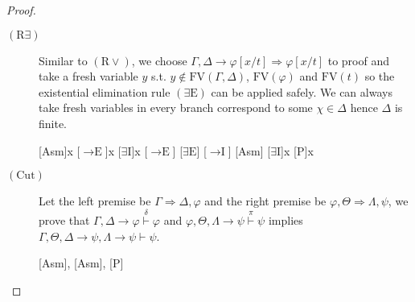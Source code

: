 \documentclass[12pt]{article}
\newcommand\A{\varphi}
\newcommand\B{\psi}
\newcommand\CC{\chi}
\newcommand\GG\Gamma
\newcommand\D\Delta
\newcommand\T\Theta
\newcommand\LL\Lambda
\newcommand\TO\Rightarrow
\newcommand\FV[1]{\mathrm{FV}({#1})}
\newcommand\RO{\textrm{R$\lor$}}
\newcommand\RX{\textrm{R$\exists$}}
\newcommand\Cut{\textrm{Cut}}
\newcommand\II{\textrm{$\to$I}}
\newcommand\IE{\textrm{$\to$E}}
\newcommand\XI{\textrm{$\exists$I}}
\newcommand\XE{\textrm{$\exists$E}}
\newcommand\PLR{\mathrm{P}}
\newcommand{\asm}[1]{\delims{[}{]^{#1}}}
\begin{document}
\begin{enumerate}
\begin{enumerate}
\begin{itemize}
\begin{proof}
\begin{description}
\begin{description}
                    \item[$(\RX)$] Similar to $(\RO)$, we choose $\GG,\D\to\A[x/t]\TO\A[x/t]$ to proof and take a fresh variable $y$ s.t. $y\notin\FV{\GG,\D}$, $\FV{\A}$ and $\FV{t}$ so the existential elimination rule $(\XE)$ can be applied safely. We can always take fresh variables in every branch correspond to some $\CC\in\D$ hence $\D$ is finite.
                    
                    \begin{prooftree*}
                    \hypo{\D}
                    \asm{u}
                    [Asm]{\D\to\exists x\A}
                    [$\IE$]{\exists x\A}
                    \hypo{\A[x/y]}
                    \asm{v}
                    [$\XI$]{\exists x\A}
                    \hypo{\exists x\A\to\A[x/t]}
                    \asm{w}
                    [$\IE$]{\A[x/t]}
                    [$\XE$]{\A[x/t]}
                    [$\II$]{\D\to\A[x/t]}
                    [Asm]{\GG}
                    \ellipsis{}{\A[x/t]}
                    [$\XI$]{\exists x\A}
                    [$\PLR$]{\exists x\A}
                    \end{prooftree*}
                    
                    \item[$(\Cut)$] Let the left premise be $\GG\TO\D,\A$ and the right premise be $\A,\T\TO\LL,\B$, we prove that $\GG,\D\to\A\overset{\delta}{\vdash}\A$ and $\A,\T,\LL\to\B\overset{\pi}{\vdash}\B$ implies $\GG,\T,\D\to\B,\LL\to\B\vdash\B$.
                    
                    \begin{prooftree*}
                    [Asm]{\GG,\D\to\B}
                    \hypo{\B\to\A}
                    \asm{u}
                    \ellipsis{$\delta$}{\A}
                    [Asm]{\T,\LL\to\B}
                    \ellipsis{$\pi$}{\B}
                    [$\PLR$]{\B}
                    \end{prooftree*}
                \end{description}
            \end{description}
            \end{proof}
            

\end{itemize}
\end{enumerate}
\end{enumerate}
\end{document}
